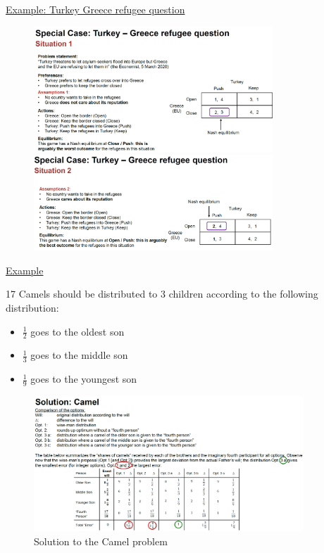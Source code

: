 \vspace{1\baselineskip}

\underline{Example: Turkey Greece refugee question}

\begin{figure}[H]
    \centering
    \includegraphics[width=0.8\textwidth]{Pictures/turkey_greece_refugees.png}

    \vspace{1\baselineskip}

    \includegraphics[width=0.8\textwidth]{Pictures/turkey_greece_refugees_2.png}
\end{figure}

\underline{Example}

\vspace{1\baselineskip}

17 Camels should be distributed to $3$ children according to the following
distribution:
\begin{itemize}
    \item $\frac{1}{2}$ goes to the oldest son
    \item $\frac{1}{3}$ goes to the middle son
    \item $\frac{1}{9}$ goes to the youngest son
\end{itemize}

\begin{figure}[h]
    \centering
    \includegraphics[width=0.9\textwidth]{Pictures/Camel_solutions.png}
    \caption{Solution to the Camel problem}
\end{figure}


